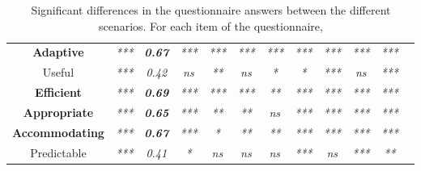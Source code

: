 \begin{table}[]
\begin{tabular}{c|c|c|c|c|c|c|c|c|c|c|c}
    \multicolumn{1}{|c|}{\textbf{Adaptive}}      & \textit{***}                                      & \textit{\textbf{0.67}}                                & \textit{***} & \textit{***} & \textit{***} & \textit{***} & \textit{***} & \textit{***} & \textit{***} & \textit{***} & \textit{} \\ \cline{1-11}
    \multicolumn{1}{|c|}{Useful}                 & \textit{***}                                      & \textit{0.42}                                         & \textit{ns}  & \textit{**}  & \textit{ns}  & \textit{*}   & \textit{*}   & \textit{***} & \textit{ns}  & \textit{***} & \textit{} \\ \cline{1-11}
    \multicolumn{1}{|c|}{\textbf{Efficient}}     & \textit{***}                                      & \textit{\textbf{0.69}}                                & \textit{***} & \textit{***} & \textit{***} & \textit{**}  & \textit{***} & \textit{***} & \textit{***} & \textit{***} & \textit{} \\ \cline{1-11}
    \multicolumn{1}{|c|}{\textbf{Appropriate}}   & \textit{***}                                      & \textit{\textbf{0.65}}                                & \textit{***} & \textit{**}  & \textit{**}  & \textit{ns}  & \textit{***} & \textit{***} & \textit{***} & \textit{***} & \textit{} \\ \cline{1-11}
    \multicolumn{1}{|c|}{\textbf{Accommodating}} & \textit{***}                                      & \textit{\textbf{0.67}}                                & \textit{***} & \textit{*}   & \textit{**}  & \textit{**}  & \textit{***} & \textit{***} & \textit{***} & \textit{***} & \textit{} \\ \cline{1-11}
    \multicolumn{1}{|c|}{Predictable}            & \textit{***}                                      & \textit{0.41}                                         & \textit{*}   & \textit{ns}  & \textit{ns}  & \textit{ns}  & \textit{***} & \textit{ns}  & \textit{***} & \textit{**}  & \textit{} \\ \cline{1-11}
    \end{tabular}
    \caption{Significant differences in the questionnaire answers between the different scenarios. For each item of the questionnaire, }
    \label{tab:questionnaire_answers}
\end{table}


